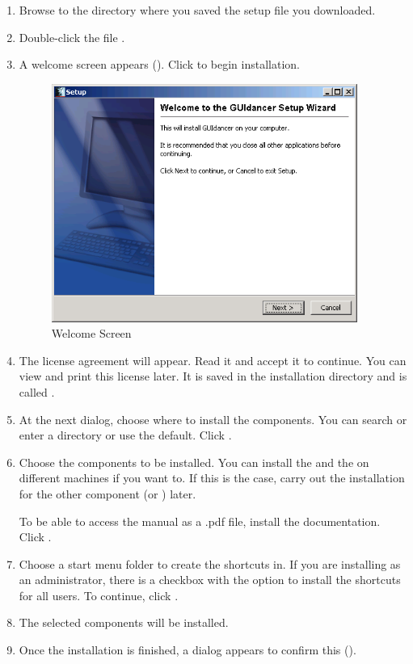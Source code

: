 

\begin{enumerate}
\item Browse to the directory where you saved the setup file you downloaded. 
\item Double-click the file . 
\item A welcome screen appears (). Click  to begin installation. 

\begin{center}
\begin{figure}[h]
  \includegraphics[width=10cm]{Windows/PS/welcome}
  \caption{Welcome Screen}
  \label{figWelcome}
\end{figure}
\end{center}


\item The license agreement will appear. Read it and accept it to continue.  
You can view and print this license later. It is saved in the installation directory and is called . 
\item At the next dialog, choose where to install the components. You can search or enter a directory or use the default. Click .
\item Choose the components to be installed.
You can install the \gdagent and the \ite{} on different machines if you want to.  If this is the case, carry out the installation for the other component (\gdagent or \ite{}) later. 

To be able to access the manual as a .pdf file, install the  documentation. Click .
 

\item Choose a start menu folder to create the shortcuts in. If you are installing as an administrator, there is a checkbox with the option to install the shortcuts for all users. To continue, click
. 
\item The selected components will  be installed.
\item Once the installation is finished, a dialog appears to confirm this ().


\end{enumerate}
